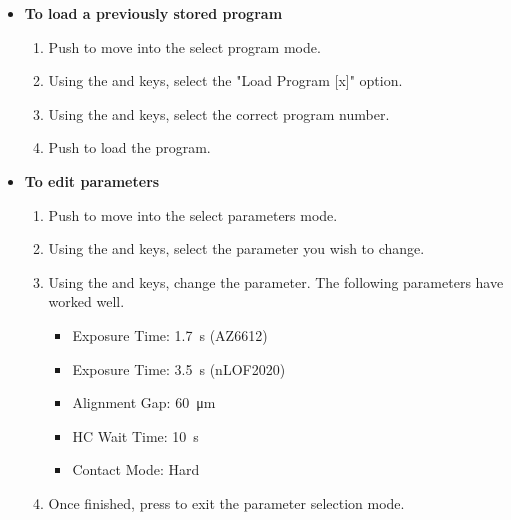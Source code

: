 \begin{enumerate}
\begin{itemize} [noitemsep, nolistsep]
  \begin{enumerate} 
    \item Push .
    \item Use the \fbox{$\uparrow$} and \fbox{$\downarrow$} keys to select a contact mode. We generally use \textbf{Hard} contact mode.
    \item Push  and move on to the edit parameters step.
  \end{enumerate}
  \item \textbf{To load a previously stored program}
  \begin{enumerate} 
    \item Push  to move into the select program mode.
    \item Using the \fbox{$\leftarrow$} and \fbox{$\rightarrow$} keys, select the "Load Program [x]" option.
    \item Using the \fbox{$\uparrow$} and \fbox{$\downarrow$} keys, select the correct program number.
    \item Push  to load the program.
  \end{enumerate}
  \item \textbf{To edit parameters}
  \begin{enumerate} 
    \item Push  to move into the select parameters mode.
    \item Using the \fbox{$\leftarrow$} and \fbox{$\rightarrow$} keys, select the parameter you wish to change.
    \item Using the \fbox{$\uparrow$} and \fbox{$\downarrow$} keys, change the parameter. The following parameters
          have worked well.
    \begin{itemize} [noitemsep, nolistsep]
      \item Exposure Time: \SI{1.7}{\second} (AZ6612)
      \item Exposure Time: \SI{3.5}{\second} (nLOF2020)
      \item Alignment Gap: \SI{60}{\micro\meter}
      \item HC Wait Time: \SI{10}{\second}
      \item Contact Mode: Hard
    \end{itemize}
    \item Once finished, press  to exit the parameter selection mode.
  \end{enumerate}

\end{itemize}
\end{enumerate}
